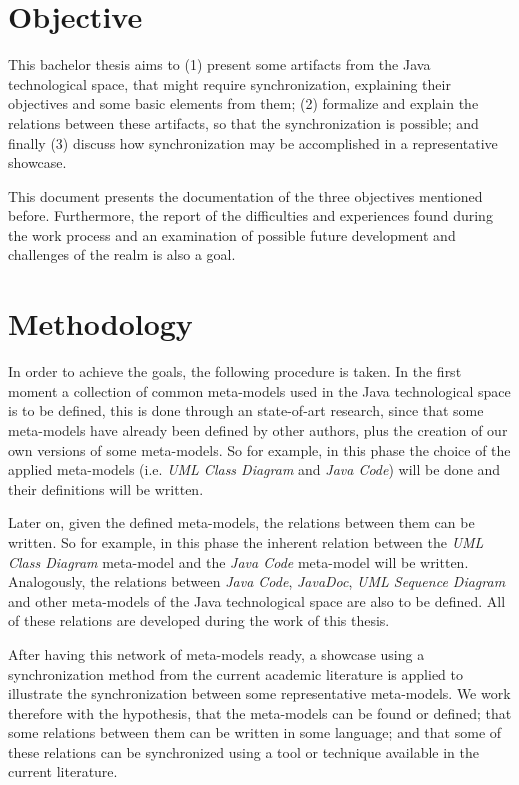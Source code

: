 \documentclass[tuberlin,cic,tc,english,noabntcite]{iiufrgs}
\begin{document}
\section{Objective}
This bachelor thesis aims to (1) present some artifacts from the Java technological space, that might require synchronization, explaining their objectives and some basic elements from them; (2) formalize and explain the relations between these artifacts, so that the synchronization is possible; and finally (3) discuss how synchronization may be accomplished in a representative showcase.

This document presents the documentation of the three objectives mentioned before. Furthermore, the report of the difficulties and experiences found during the work process and an examination of possible future development and challenges of the realm is also a goal.


\section{Methodology}
In order to achieve the goals, the following procedure is taken. In the first moment a collection of common meta-models used in the Java technological space is to be defined, this is done through an state-of-art research, since that some meta-models have already been defined by other authors, plus the creation of our own versions of some meta-models. So for example, in this phase the choice of the applied meta-models (i.e. \emph{UML Class Diagram} and \emph{Java Code}) will be done and their definitions will be written.

Later on, given the defined meta-models, the relations between them can be written. So for example, in this phase the inherent relation between the \emph{UML Class Diagram} meta-model and the \emph{Java Code} meta-model will be written. Analogously, the relations between \emph{Java Code}, \emph{JavaDoc}, \emph{UML Sequence Diagram} and other meta-models of the Java technological space are also to be defined. All of these relations are developed during the work of this thesis.

After having this network of meta-models ready, a showcase using a synchronization method from the current academic literature is applied to illustrate the synchronization between some representative meta-models. We work therefore with the hypothesis, that the meta-models can be found or defined; that some relations between them can be written in some language; and that some of these relations can be synchronized using a tool or technique available in the current literature.
\end{document}
